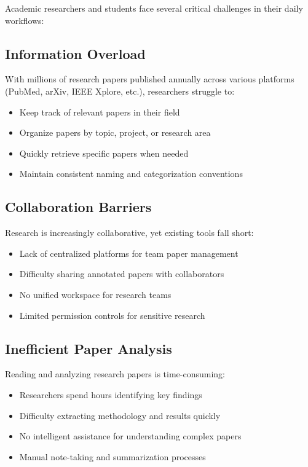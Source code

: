 Academic researchers and students face several critical challenges in their daily workflows:

\subsection{Information Overload}

With millions of research papers published annually across various platforms (PubMed, arXiv, IEEE Xplore, etc.), researchers struggle to:
\begin{itemize}[leftmargin=*]
    \item Keep track of relevant papers in their field
    \item Organize papers by topic, project, or research area
    \item Quickly retrieve specific papers when needed
    \item Maintain consistent naming and categorization conventions
\end{itemize}

\subsection{Collaboration Barriers}

Research is increasingly collaborative, yet existing tools fall short:
\begin{itemize}[leftmargin=*]
    \item Lack of centralized platforms for team paper management
    \item Difficulty sharing annotated papers with collaborators
    \item No unified workspace for research teams
    \item Limited permission controls for sensitive research
\end{itemize}

\subsection{Inefficient Paper Analysis}

Reading and analyzing research papers is time-consuming:
\begin{itemize}[leftmargin=*]
    \item Researchers spend hours identifying key findings
    \item Difficulty extracting methodology and results quickly
    \item No intelligent assistance for understanding complex papers
    \item Manual note-taking and summarization processes
\end{itemize}

